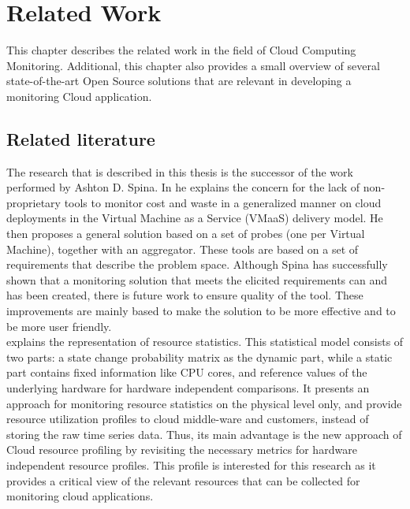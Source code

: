 \chapter{Related Work}\label{ch:related_work}
This chapter describes the related work in the field of Cloud Computing Monitoring. Additional, this chapter also provides a small overview of several state-of-the-art Open Source solutions that are relevant in developing a monitoring Cloud application.

\section{Related literature} \label{sec:related_literature}
The research that is described in this thesis is the successor of the work performed by Ashton D. Spina. In \cite{spina} he explains the concern for the lack of non-proprietary tools to monitor cost and waste in a generalized manner on cloud deployments in the Virtual Machine as a Service (VMaaS) delivery model. He then proposes a general solution based on a set of probes (one per Virtual Machine), together with an aggregator. These tools are based on a set of requirements that describe the problem space. Although Spina has successfully shown that a monitoring solution that meets the elicited requirements can and has been created, there is future work to ensure quality of the tool. These improvements are mainly based to make the solution to be more effective and to be more user friendly.\\

\noindent
\cite{hauser2018reviewing} explains the representation of resource statistics. This statistical model consists of two parts: a state change probability matrix as the dynamic part, while a static part contains fixed information like CPU cores, and reference values of the underlying hardware for hardware independent comparisons. It presents an approach for monitoring resource statistics on the physical level only, and provide resource utilization profiles to cloud middle-ware and customers, instead of storing the raw time series data. Thus, its main advantage is the new approach of Cloud resource profiling by revisiting the necessary metrics for hardware independent resource profiles. This profile is interested for this research as it provides a critical view of the relevant resources that can be collected for monitoring cloud applications.\\

